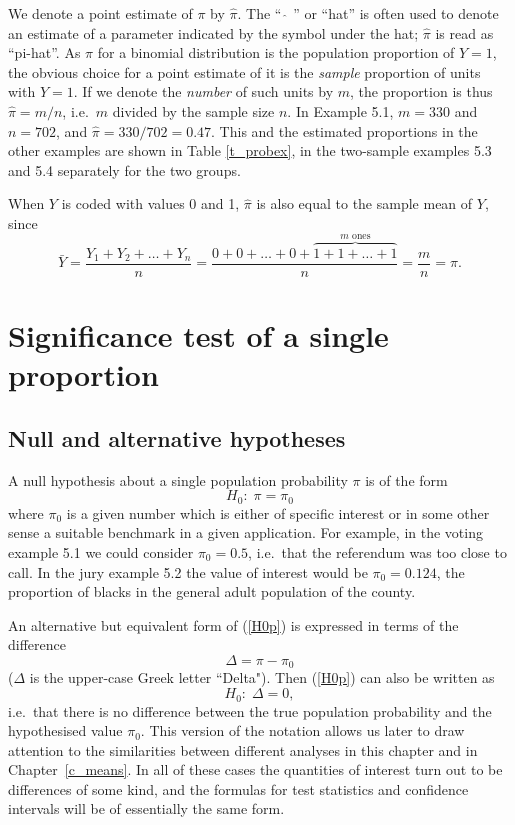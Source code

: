 We denote a point estimate of $\pi$ by $\hat{\pi}$. The ``$\; \hat{\;}
\; $'' or ``hat'' is often used to denote an estimate of a
parameter indicated by the symbol under the hat; $\hat{\pi}$ is read as
``pi-hat''. As $\pi$ for a binomial distribution is the population
proportion of $Y=1$, the obvious choice for a point estimate of it is
the \emph{sample} proportion of units with $Y=1$. If we denote the
\emph{number} of such units by $m$, the proportion is thus
$\hat{\pi}=m/n$, i.e.\ $m$ divided by the sample size $n$. In Example
5.1, $m=330$ and $n=702$, and $\hat{\pi}=330/702=0.47$. This and the
estimated proportions in the other examples are shown in Table
\ref{t_probex}, in the two-sample examples 5.3 and 5.4 separately for
the two groups.

When $Y$ is coded with values 0 and 1, $\hat{\pi}$ is also equal to the
sample mean of $Y$, since
\begin{equation}
\bar{Y}=\frac{Y_{1}+Y_{2}+\dots+Y_{n}}{n}=
\frac{0+0+\dots+0+\overbrace{1+1+\dots+1}^{m \text{ ones}}}{n}=
\frac{m}{n}=\hat{\pi}.
\label{pihat_as_ybar}
\end{equation}

\section{Significance test of a single proportion}
\label{s_probs_test1sample}

\subsection{Null and alternative hypotheses}
\label{ss-probs-test1sample-hypotheses}

A null hypothesis about a single population probability $\pi$ is of the
form
\begin{equation}
H_{0}:\; \pi=\pi_{0}
\label{H0p}
\end{equation}
where $\pi_{0}$ is a given number which is either of specific interest
or in some other sense a suitable benchmark in a given application. For
example, in the voting example 5.1 we could consider $\pi_{0}=0.5$,
i.e.\ that the referendum was too close to call. In the jury example 5.2
the value of interest would be $\pi_{0}=0.124$, the proportion of blacks
in the general adult population of the county.

An alternative but equivalent form of (\ref{H0p})
is expressed in terms of the difference
\begin{equation}
\Delta=\pi-\pi_{0}
\label{Dp}
\end{equation}
($\Delta$ is the upper-case Greek letter ``Delta"). Then (\ref{H0p}) can also be
written as
\begin{equation}
H_{0}: \; \Delta=0,
\label{H0p2}
\end{equation}
i.e.\ that there is no difference between the true population
probability and the hypothesised value $\pi_{0}$. This version
of the notation allows us later to
draw attention to the similarities between different analyses
in this chapter and in Chapter~\ref{c_means}. In all of these cases the
quantities of interest turn out to be differences of some kind, and the
formulas for test statistics and confidence intervals will be of
essentially the same form.

